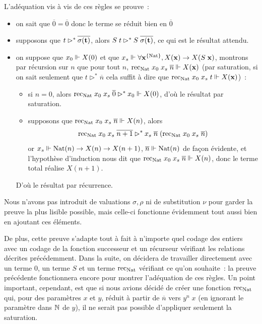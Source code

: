 \documentclass{article}
\begin{document}
L'adéquation vis à vis de ces règles se prouve~:
\begin{itemize}
    \item on sait que $\overline 0 = \overline 0$ donc le terme se réduit bien en $\overline 0$
    \item supposons que $t\rhd^* \overline{\sigma(\mathbf{t})}$, alors $S\;t \rhd^* S\;\overline{\sigma(\mathbf{t})}$, ce qui est le résultat attendu.
    \item on suppose que $x_0 \Vdash X(0)$ et que $x_s \Vdash \forall \mathbf{x}^{\{\mathrm{Nat}\}}, X(\mathbf{x}) \to X(S\;\mathbf{x})$, montrons par récursion sur $n$ que pour tout $n$, $\mathrm{rec}_{\mathrm{Nat}}\;x_0\;x_s\;\overline n \Vdash X(\mathbf{x})$ (par saturation, si on sait seulement que $t \rhd^* \overline n$ cela suffit à dire que $\mathrm{rec}_{\mathrm{Nat}}\;x_0\;x_s\;t \Vdash X(\mathbf{x})$)~:
    \begin{itemize}
        \item si $n = 0$, alors $\mathrm{rec}_{\mathrm{Nat}}\;x_0\;x_s\;\overline 0 \rhd^* x_0 \Vdash X(0)$, d'où le résultat par saturation.
        \item supposons que $\mathrm{rec}_{\mathrm{Nat}}\;x_0\;x_s\;\overline n \Vdash X(n)$, alors
            \[\mathrm{rec}_{\mathrm{Nat}}\;x_0\;x_s\;\overline{n+1} \rhd^* x_s\;\overline n\;(\mathrm{rec}_{\mathrm{Nat}}\;x_0\;x_s\;\overline n)\]
        or $x_s \Vdash \mathrm{Nat}(n) \to X(n) \to X(n+1)$, $\overline n \Vdash \mathrm{Nat}(n)$ de façon évidente, et l'hypothèse d'induction nous dit que $\mathrm{rec}_{\mathrm{Nat}}\;x_0\;x_s\;\overline n \Vdash X(n)$, donc le terme total réalise $X(n+1)$.
    \end{itemize}
    D'où le résultat par récurrence.
\end{itemize}

Nous n'avons pas introduit de valuations $\sigma, \rho$ ni de substitution $\nu$ pour garder la preuve la plus lisible possible, mais celle-ci fonctionne évidemment tout aussi bien en ajoutant ces éléments.

De plus, cette preuve s'adapte tout à fait à n'importe quel codage des entiers avec un codage de la fonction successeur et un récurseur vérifiant les relations décrites précédemment. Dans la suite, on décidera de travailler directement avec un terme $0$, un terme $S$ et un terme $\mathrm{rec}_{\mathrm{Nat}}$ vérifiant ce qu'on souhaite~: la preuve précédente fonctionnera encore pour montrer l'adéquation de ces règles. Un point important, cependant, est que si nous avions décidé de créer une fonction $\mathrm{rec}_{\mathrm{Nat}}$ qui, pour des paramètres $x$ et $y$, réduit à partir de $\overline n$ vers $y^n\;x$ (en ignorant le paramètre dans $\mathbb{N}$ de $y$), il ne serait pas possible d'appliquer seulement la saturation.
\end{document}
